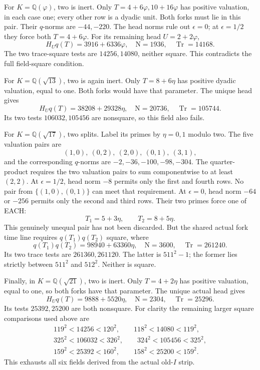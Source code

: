 For \(K=\mathbb Q(\varphi)\), two
is inert.
Only \(T=4+6\varphi,10+16\varphi\)
has positive valuation, in each
case one; every other row is a
dyadic unit.
Both forks must lie in this pair.
Their \(q\)-norms are \(-44,-220\).
The head norms rule out
\(\epsilon=0\); at \(\epsilon=1/2\)
they force both \(T=4+6\varphi\).
For its remaining head \(U=2+2\varphi\),
\[
 H_Uq(T)=3916+6336\varphi,\quad
 \mathrm N=1936,\quad\operatorname{Tr}=14168 .
\]
The two trace-square tests are
\(14256,14080\), neither square.
This contradicts the full
field-square condition.

For \(K=\mathbb Q(\sqrt{13})\), two
is again inert.
Only \(T=8+6\eta\) has positive
dyadic valuation, equal to one.
Both forks would have that parameter.
The unique head gives
\[
 H_Uq(T)=38208+29328\eta,\quad
 \mathrm N=20736,\quad\operatorname{Tr}=105744 .
\]
Its two tests \(106032,105456\)
are nonsquare, so this field also
fails.

For \(K=\mathbb Q(\sqrt{17})\), two
splits.
Label its primes by \(\eta=0,1\)
modulo two.
The five valuation pairs are
\[
                (1,0),\ (0,2),\ (2,0),\ (0,1),\ (3,1),
\]
and the corresponding \(q\)-norms
are \(-2,-36,-100,-98,-304\).
The quarter-product requires the
two valuation pairs to sum
componentwise to at least \((2,2)\).
At \(\epsilon=1/2\), head norm
\(-8\) permits only the first and
fourth rows.
No pair from \(\{(1,0),(0,1)\}\)
can meet that requirement.
At \(\epsilon=0\), head norm
\(-64\) or \(-256\) permits only
the second and third rows.
Their two primes force one of EACH:
\[
                          T_1=5+3\eta,\qquad T_2=8+5\eta .
\]
This genuinely unequal pair has
not been discarded.
But the shared actual fork time
line requires \(q(T_1)q(T_2)\) square,
where
\[
 q(T_1)q(T_2)=98940+63360\eta,\quad
 \mathrm N=3600,\quad\operatorname{Tr}=261240 .
\]
Its two trace tests are
\(261360,261120\).
The latter is \(511^2-1\);
the former lies strictly between
\(511^2\) and \(512^2\).
Neither is square.

Finally, in \(K=\mathbb Q(\sqrt{21})\),
two is inert.
Only \(T=4+2\eta\) has positive
valuation, equal to one, so both
forks have that parameter.
The unique actual head gives
\[
 H_Uq(T)=9888+5520\eta,\quad
 \mathrm N=2304,\quad\operatorname{Tr}=25296 .
\]
Its tests \(25392,25200\) are both
nonsquare.
For clarity the remaining larger
square comparisons used above are
\[
\begin{gathered}
119^2<14256<120^2,\qquad118^2<14080<119^2,\\
325^2<106032<326^2,\qquad324^2<105456<325^2,\\
159^2<25392<160^2,\qquad158^2<25200<159^2 .
\end{gathered}
\]
This exhausts all six fields
derived from the actual old-\(I\)
strip.

